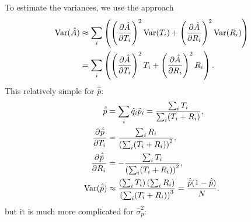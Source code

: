 \documentclass[12pt]{article}
\newcommand{\pdiff}[3][\rule{0mm}{0mm}]{\frac{\partial^{#1} #2}{\partial {#3}^{#1}}}
\newcommand{\pdiffc}[3][\rule{0mm}{0mm}]{\left (\frac{\partial #2}{\partial {#3}}\right )_{\!\!#1}}
\DeclareMathOperator{\var}{Var}
\newcommand{\prn}[1]{\left ( #1 \right )}
\begin{document}
To estimate the variances, we use the approach
%
\begin{equation}\label{eq:estvarest}
\begin{aligned}
  \var(\hat{A}) &\approx \sum_i\prn{ \pdiffc{\hat{A}}{T_i}^2 \var(T_i) + \pdiffc{\hat{A}}{R_i}^2 \var(R_i) }
  \\&= \sum_i\prn{ \pdiffc{\hat{A}}{T_i}^2 T_i + \pdiffc{\hat{A}}{R_i}^2 R_i }.
\end{aligned}
\end{equation}
%
This relatively simple for $\hat{\bar{p}}$:
%
\begin{equation}\label{eq:varpbar}
  \begin{aligned}
    \hat{\bar{p}} &= \sum_i \hat{q}_i \hat{p}_i = \frac{\sum_iT_i}{\sum_i(T_i+R_i)}, \\
    \pdiff{\hat{\bar{p}}}{T_i}  &= \frac{\sum_iR_i}{\prn{\sum_i(T_i+R_i)}^2},\\
    \pdiff{\hat{\bar{p}}}{R_i}  &= -\frac{\sum_iT_i}{\prn{\sum_i(T_i+R_i)}^2},\\
    \var(\hat{\bar{p}}) &\approx \frac{\prn{\sum_iT_i}\prn{\sum_iR_i}}{\prn{\sum_i(T_i+R_i)}^3} = \frac{\hat{\bar{p}}(1-\hat{\bar{p}})}{N}.
  \end{aligned}
\end{equation}
%
but it is much more complicated for $\hat{\sigma}_p^2$:
%
\end{document}
